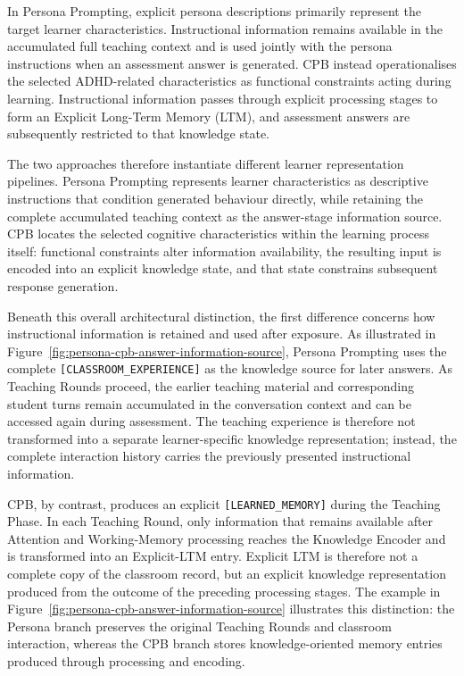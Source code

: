 In Persona Prompting, explicit persona descriptions primarily represent the target learner characteristics. Instructional information remains available in the accumulated full teaching context and is used jointly with the persona instructions when an assessment answer is generated. CPB instead operationalises the selected ADHD-related characteristics as functional constraints acting during learning. Instructional information passes through explicit processing stages to form an Explicit Long-Term Memory (LTM), and assessment answers are subsequently restricted to that knowledge state.

The two approaches therefore instantiate different learner representation pipelines. Persona Prompting represents learner characteristics as descriptive instructions that condition generated behaviour directly, while retaining the complete accumulated teaching context as the answer-stage information source. CPB locates the selected cognitive characteristics within the learning process itself: functional constraints alter information availability, the resulting input is encoded into an explicit knowledge state, and that state constrains subsequent response generation.

Beneath this overall architectural distinction, the first difference concerns how instructional information is retained and used after exposure. As illustrated in Figure~\ref{fig:persona-cpb-answer-information-source}, Persona Prompting uses the complete \texttt{[CLASSROOM\_EXPERIENCE]} as the knowledge source for later answers. As Teaching Rounds proceed, the earlier teaching material and corresponding student turns remain accumulated in the conversation context and can be accessed again during assessment. The teaching experience is therefore not transformed into a separate learner-specific knowledge representation; instead, the complete interaction history carries the previously presented instructional information.

CPB, by contrast, produces an explicit \texttt{[LEARNED\_MEMORY]} during the Teaching Phase. In each Teaching Round, only information that remains available after Attention and Working-Memory processing reaches the Knowledge Encoder and is transformed into an Explicit-LTM entry. Explicit LTM is therefore not a complete copy of the classroom record, but an explicit knowledge representation produced from the outcome of the preceding processing stages. The example in Figure~\ref{fig:persona-cpb-answer-information-source} illustrates this distinction: the Persona branch preserves the original Teaching Rounds and classroom interaction, whereas the CPB branch stores knowledge-oriented memory entries produced through processing and encoding.

